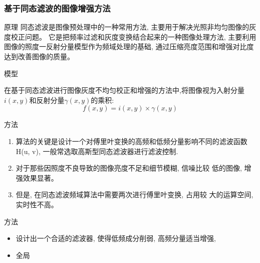 \documentclass{beamer}
\begin{document}
\begin{frame}

  \frametitle{基于同态滤波的图像增强方法}

  \begin{block}{原理}
    同态滤波是图像预处理中的一种常用方法, 主要用于解决光照非均匀图像的灰度校正问题。
    它是把频率过滤和灰度变换结合起来的一种图像处理方法, 主要利用图像的照度一反射分量模型作为频域处理的基础, 通过压缩亮度范围和增强对比度达到改善图像的质量。
  \end{block}

  \begin{block}{模型}

  在基于同态滤波进行图像灰度不均匀校正和增强的方法中,将图像视为入射分量
  $i(x,y)$和反射分量$\gamma(x,y)$的乘积:
  \begin{equation}
    \label{eq:21}
    f(x,y)=i(x,y)\times\gamma(x,y)
  \end{equation}

\end{block}




\end{frame}

\begin{frame}
  \begin{block}{方法}

  \begin{enumerate}
  \item 算法的关键是设计一个对傅里叶变换的高频和低频分量影响不同的滤波函数 H(u, v), 一般常选取高斯型同态滤波器进行滤波控制.
  \item 对于那些因照度不良导致的图像亮度不足和细节模糊, 信噪比较
低的图像, 增强效果显著。
\item 但是, 在同态滤波频域算法中需要两次进行傅里叶变换, 占用较
大的运算空间, 实时性不高。
\end{enumerate}
\end{block}
\end{frame}


\begin{frame}
  \begin{block}{方法}
    \begin{itemize}
    \item 设计出一个合适的滤波器, 使得低频成分削弱, 高频分量适当增强,
    \item 全局
    \end{itemize}
  \end{block}
\end{frame}
\end{document}
